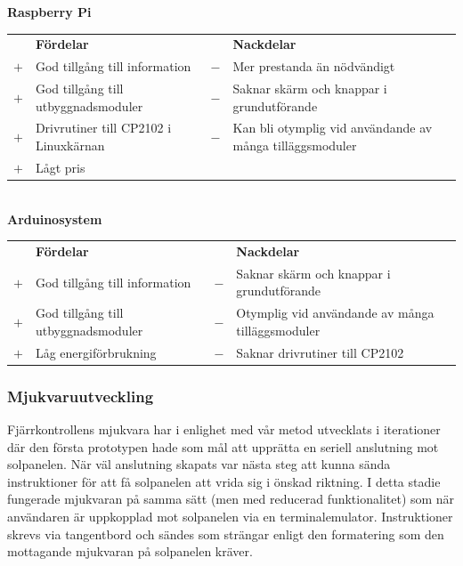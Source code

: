 \documentclass{article}
\begin{document}
                
            \noindent\textsf{\textbf{Raspberry Pi}}\\
            \begin{tabularx}{\textwidth}{@{}cXcX}
                & \textbf{Fördelar}     & & \textbf{Nackdelar} \\
                $+$ & God tillgång till information & 
                                        $-$ & Mer prestanda än nödvändigt \\
                $+$ & God tillgång till utbyggnads\-moduler & 
                                        $-$ & Saknar skärm och knappar i 
                                              grundutförande \\
                $+$ & Drivrutiner till CP2102 i Linuxkärnan &
                                        $-$ & Kan bli otymplig vid användande av   
                                              många tilläggsmoduler \\   
                $+$ & Lågt pris \\   
            \end{tabularx}\\
            
            \noindent\textsf{\textbf{Arduinosystem}} \\ 
            \begin{tabularx}{\textwidth}{@{}cXcX} 
                & \textbf{Fördelar}     & & \textbf{Nackdelar} \\
                $+$ & God tillgång till information & 
                                        $-$ & Saknar skärm och knappar i 
                                            grundutförande \\
                $+$ & God tillgång till utbyggnads\-moduler & 
                                        $-$ & Otymplig vid användande av   
                                            många tilläggsmoduler \\
                $+$ & Låg energiförbrukning &
                                        $-$ & Saknar drivrutiner till CP2102 \\

            \end{tabularx}

            \subsubsection{Mjukvaruutveckling} %
            \label{subsub:mjukvaruutveckling}
            Fjärrkontrollens mjukvara har i enlighet med vår metod utvecklats i iterationer där den första prototypen hade som mål att upprätta en seriell anslutning mot solpanelen.
            När väl anslutning skapats var nästa steg att kunna sända instruktioner för att få solpanelen att vrida sig i önskad riktning. I detta stadie fungerade mjukvaran på samma sätt (men med reducerad funktionalitet) som när användaren är uppkopplad mot solpanelen via en terminalemulator. Instruktioner skrevs via tangentbord och sändes som strängar enligt den formatering som den mottagande mjukvaran på solpanelen kräver. \\
\end{document}
